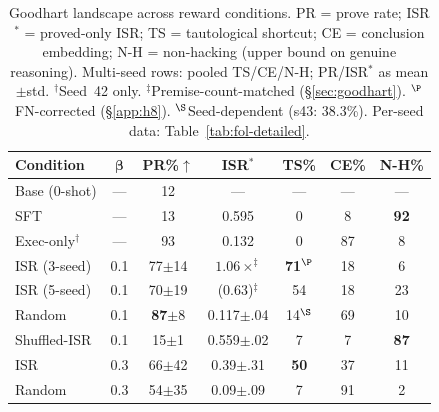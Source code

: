 \begin{table}[t]
\centering
\small
\begin{tabular}{lcccccc}
\toprule
\textbf{Condition} & $\boldsymbol{\beta}$ & \textbf{PR\%}$\uparrow$ & \textbf{ISR}$^*$ & \textbf{TS\%} & \textbf{CE\%} & \textbf{N-H\%} \\
\midrule
Base (0-shot) & --- & 12 & --- & --- & --- & --- \\ %
SFT & --- & 13 & 0.595 & 0 & 8 & \textbf{92} \\ %
\midrule
Exec-only$^\dagger$ & --- & 93 & 0.132 & 0 & 87 & 8 \\ %
ISR (3-seed) & 0.1 & 77{\scriptsize$\pm$14} & $1.06\times^\ddagger$ & \textbf{71}$^\P$ & 18 & 6 \\ %
ISR (5-seed) & 0.1 & 70{\scriptsize$\pm$19} & (0.63)$^\ddagger$ & 54 & 18 & 23 \\ %
Random & 0.1 & \textbf{87}{\scriptsize$\pm$8} & 0.117{\scriptsize$\pm$.04} & 14$^\S$ & 69 & 10 \\ %
Shuffled-ISR & 0.1 & 15{\scriptsize$\pm$1} & 0.559{\scriptsize$\pm$.02} & 7 & 7 & \textbf{87} \\ %
\midrule
ISR & 0.3 & 66{\scriptsize$\pm$42} & 0.39{\scriptsize$\pm$.31} & \textbf{50} & 37 & 11 \\ %
Random & 0.3 & 54{\scriptsize$\pm$35} & 0.09{\scriptsize$\pm$.09} & 7 & 91 & 2 \\ %
\bottomrule
\end{tabular}
\caption{Goodhart landscape across reward conditions. PR = prove rate; ISR$^*$ = proved-only ISR; TS = tautological shortcut; CE = conclusion embedding; N-H = non-hacking (upper bound on genuine reasoning). Multi-seed rows: pooled TS/CE/N-H; PR/ISR$^*$ as mean$\pm$std. $^\dagger$Seed~42 only. $^\ddagger$Premise-count-matched (\S\ref{sec:goodhart}). $^\P$FN-corrected (\S\ref{app:h8}). $^\S$Seed-dependent (s43: 38.3\%). Per-seed data: Table~\ref{tab:fol-detailed}.}
\label{tab:goodhart-landscape}
\end{table}

